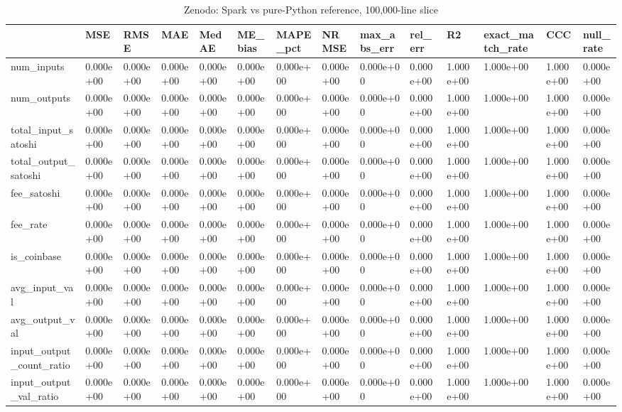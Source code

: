 \begin{table}
\caption{Zenodo: Spark vs pure-Python reference, 100,000-line slice}
\label{tab:01A_zenodo_feature_error}
\begin{tabular}{llllllllllllll}
\toprule
 & MSE & RMSE & MAE & MedAE & ME\_bias & MAPE\_pct & NRMSE & max\_abs\_err & rel\_err & R2 & exact\_match\_rate & CCC & null\_rate \\
\midrule
num\_inputs & 0.000e+00 & 0.000e+00 & 0.000e+00 & 0.000e+00 & 0.000e+00 & 0.000e+00 & 0.000e+00 & 0.000e+00 & 0.000e+00 & 1.000e+00 & 1.000e+00 & 1.000e+00 & 0.000e+00 \\
num\_outputs & 0.000e+00 & 0.000e+00 & 0.000e+00 & 0.000e+00 & 0.000e+00 & 0.000e+00 & 0.000e+00 & 0.000e+00 & 0.000e+00 & 1.000e+00 & 1.000e+00 & 1.000e+00 & 0.000e+00 \\
total\_input\_satoshi & 0.000e+00 & 0.000e+00 & 0.000e+00 & 0.000e+00 & 0.000e+00 & 0.000e+00 & 0.000e+00 & 0.000e+00 & 0.000e+00 & 1.000e+00 & 1.000e+00 & 1.000e+00 & 0.000e+00 \\
total\_output\_satoshi & 0.000e+00 & 0.000e+00 & 0.000e+00 & 0.000e+00 & 0.000e+00 & 0.000e+00 & 0.000e+00 & 0.000e+00 & 0.000e+00 & 1.000e+00 & 1.000e+00 & 1.000e+00 & 0.000e+00 \\
fee\_satoshi & 0.000e+00 & 0.000e+00 & 0.000e+00 & 0.000e+00 & 0.000e+00 & 0.000e+00 & 0.000e+00 & 0.000e+00 & 0.000e+00 & 1.000e+00 & 1.000e+00 & 1.000e+00 & 0.000e+00 \\
fee\_rate & 0.000e+00 & 0.000e+00 & 0.000e+00 & 0.000e+00 & 0.000e+00 & 0.000e+00 & 0.000e+00 & 0.000e+00 & 0.000e+00 & 1.000e+00 & 1.000e+00 & 1.000e+00 & 0.000e+00 \\
is\_coinbase & 0.000e+00 & 0.000e+00 & 0.000e+00 & 0.000e+00 & 0.000e+00 & 0.000e+00 & 0.000e+00 & 0.000e+00 & 0.000e+00 & 1.000e+00 & 1.000e+00 & 1.000e+00 & 0.000e+00 \\
avg\_input\_val & 0.000e+00 & 0.000e+00 & 0.000e+00 & 0.000e+00 & 0.000e+00 & 0.000e+00 & 0.000e+00 & 0.000e+00 & 0.000e+00 & 1.000e+00 & 1.000e+00 & 1.000e+00 & 0.000e+00 \\
avg\_output\_val & 0.000e+00 & 0.000e+00 & 0.000e+00 & 0.000e+00 & 0.000e+00 & 0.000e+00 & 0.000e+00 & 0.000e+00 & 0.000e+00 & 1.000e+00 & 1.000e+00 & 1.000e+00 & 0.000e+00 \\
input\_output\_count\_ratio & 0.000e+00 & 0.000e+00 & 0.000e+00 & 0.000e+00 & 0.000e+00 & 0.000e+00 & 0.000e+00 & 0.000e+00 & 0.000e+00 & 1.000e+00 & 1.000e+00 & 1.000e+00 & 0.000e+00 \\
input\_output\_val\_ratio & 0.000e+00 & 0.000e+00 & 0.000e+00 & 0.000e+00 & 0.000e+00 & 0.000e+00 & 0.000e+00 & 0.000e+00 & 0.000e+00 & 1.000e+00 & 1.000e+00 & 1.000e+00 & 0.000e+00 \\

\end{tabular}
\end{table}

